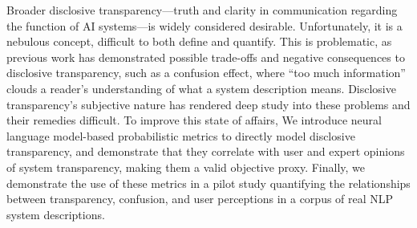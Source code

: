 Broader disclosive transparency—truth and clarity in communication regarding the function of AI systems—is widely considered desirable. Unfortunately, it is a nebulous concept, difficult to both define and quantify. This is problematic, as previous work has demonstrated possible trade-offs and negative consequences to disclosive transparency, such as a confusion effect, where ``too much information'' clouds a reader's understanding of what a system description means. Disclosive transparency's subjective nature has rendered deep study into these problems and their remedies difficult. To improve this state of affairs, We introduce neural language model-based probabilistic metrics to directly model disclosive transparency, and demonstrate that they correlate with user and expert opinions of system transparency, making them a valid objective proxy. Finally, we demonstrate the use of these metrics in a pilot study quantifying the relationships between transparency, confusion, and user perceptions in a corpus of real NLP system descriptions.

